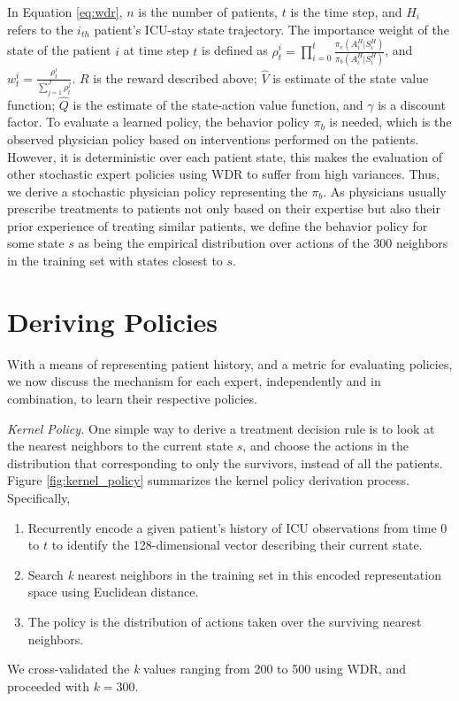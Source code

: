 \documentclass[10pt]{amia}
\begin{document}
In Equation \ref{eq:wdr}, $n$ is the number of patients, $t$ is the time step, and $H_{i}$ refers to the $i_{th}$ patient's ICU-stay state trajectory. The importance weight of the state of the patient $i$ at time step $t$ is defined as $\rho^{i}_{t} = \prod^{t}_{i=0}\frac{\pi_{e}(A^{H}_{i}|S^{H}_{i})}{\pi_{b}(A^{H}_{i}|S^{H}_{i})}$, and $w^{i}_{t}=\frac{\rho^{i}_{t}}{\sum^{J}_{j=1}\rho^{j}_{t}}$. $R$ is the reward described above; $\hat{V}$ is estimate of the state value function; $\hat{Q}$ is the estimate of the state-action value function, and $\gamma$ is a discount factor. To evaluate a learned policy, the behavior policy $\pi_{b}$ is needed, which is the observed physician policy based on interventions performed on the patients. However, it is deterministic over each patient state, this makes the evaluation of other stochastic expert policies using WDR to suffer from high variances. Thus, we derive a stochastic physician policy representing the $\pi_{b}$. As physicians usually prescribe treatments to patients not only based on their expertise but also their prior experience of treating similar patients,\cite{norman2005research} we define the behavior policy for some state $s$ as being the empirical distribution over actions of the 300 neighbors in the training set with states closest to $s$. 

\section*{Deriving Policies}
\label{subsec:dp}

With a means of representing patient history, and a metric for evaluating policies, we now discuss the mechanism for each expert, independently and in combination, to learn their respective policies. 

\textit{Kernel Policy.} One simple way to derive a treatment decision rule is to look at the nearest neighbors to the current state $s$, and choose the actions in the distribution that corresponding to only the survivors, instead of all the patients. Figure \ref{fig:kernel_policy} summarizes the kernel policy derivation process. Specifically,
\begin{enumerate}
\item Recurrently encode a given patient's history of ICU observations from time $0$ to $t$ to identify the 128-dimensional vector describing their current state. 
\item Search \textit{k} nearest neighbors in the training set in this encoded representation space using Euclidean distance.
\item The policy is the distribution of actions taken over the surviving nearest neighbors.
\end{enumerate}
We cross-validated the \textit{k} values ranging from 200 to 500 using WDR, and proceeded with $k=300$. 
\end{document}

